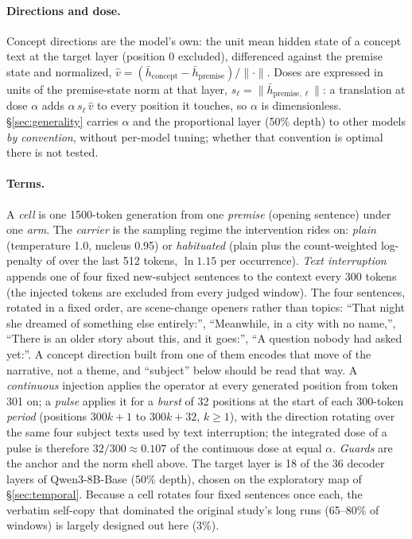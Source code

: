 \documentclass[11pt]{article}
\begin{document}
\paragraph{Directions and dose.} Concept directions are the model's
own: the unit mean hidden state of a concept text at the target layer
(position 0 excluded), differenced against the premise state and
normalized, $\hat v = (\bar h_{\mathrm{concept}} -
\bar h_{\mathrm{premise}})/\lVert\cdot\rVert$. Doses are expressed in
units of the premise-state norm at that layer, $s_\ell = \lVert \bar
h_{\mathrm{premise},\ell}\rVert$: a translation at dose $\alpha$ adds
$\alpha\, s_\ell\, \hat v$ to every position it touches, so $\alpha$ is
dimensionless. \S\ref{sec:generality} carries $\alpha$ and the
proportional layer (50\% depth) to other models \emph{by convention},
without per-model tuning; whether that convention is optimal there is
not tested.

\paragraph{Terms.} A \emph{cell} is one 1500-token generation from one
\emph{premise} (opening sentence) under one \emph{arm}. The
\emph{carrier} is the sampling regime the intervention rides on:
\emph{plain} (temperature 1.0, nucleus 0.95) or \emph{habituated}
(plain plus the count-weighted log-penalty of
\citet{ono2026interrupting} over the last 512 tokens, $\ln 1.15$ per
occurrence). \emph{Text interruption} appends one of four fixed
new-subject sentences to the context every 300 tokens (the injected
tokens are excluded from every judged window). The four sentences,
rotated in a fixed order, are scene-change openers rather than topics:
``That night she dreamed of something else entirely:'', ``Meanwhile, in
a city with no name,'', ``There is an older story about this, and it
goes:'', ``A question nobody had asked yet:''. A concept direction built
from one of them encodes that move of the narrative, not a theme, and
``subject'' below should be read that way. A \emph{continuous}
injection applies the operator at every generated position from token
301 on; a \emph{pulse} applies it for a \emph{burst} of 32 positions at
the start of each 300-token \emph{period} (positions $300k{+}1$ to
$300k{+}32$, $k \ge 1$), with the direction rotating over the same four
subject texts used by text interruption; the integrated dose of a pulse
is therefore $32/300 \approx 0.107$ of the continuous dose at equal
$\alpha$. \emph{Guards} are the anchor and the norm shell above. The target
layer is 18 of the 36 decoder layers of Qwen3-8B-Base (50\% depth),
chosen on the exploratory map of \S\ref{sec:temporal}. Because a cell
rotates four fixed sentences once each, the verbatim self-copy that
dominated the original study's long runs (65--80\% of windows) is
largely designed out here (3\%).
\end{document}
